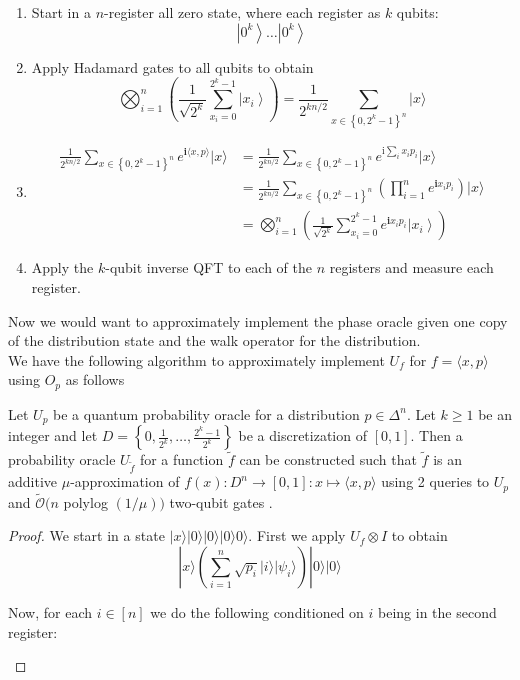 \begin{flushleft}
\begin{flushleft}
\begin{enumerate}
 
\item Start in a $n$-register all zero state, where each register as $k$ qubits:
$$
\left|0^k\right\rangle \ldots\left|0^k\right\rangle
$$
\item Apply Hadamard gates to all qubits to obtain
$$
\bigotimes_{i=1}^n\left(\frac{1}{\sqrt{2^k}} \sum_{x_i=0}^{2^k-1}\left|x_i\right\rangle\right)=\frac{1}{2^{k n / 2}} \sum_{x \in\left\{0,2^k-1\right\}^n}|x\rangle
$$
\item 
$$
\begin{aligned}
	\frac{1}{2^{k n / 2}} \sum_{x \in\left\{0,2^k-1\right\}^n} e^{\mathbf{i}\langle x, p\rangle}|x\rangle & =\frac{1}{2^{k n / 2}} \sum_{x \in\left\{0,2^k-1\right\}^n} e^{\mathrm{i} \sum_i x_i p_i}|x\rangle \\
	& =\frac{1}{2^{k n / 2}} \sum_{x \in\left\{0,2^k-1\right\}^n}\left(\prod_{i=1}^n e^{\mathbf{i} x_i p_i}\right)|x\rangle \\
	& =\bigotimes_{i=1}^n\left(\frac{1}{\sqrt{2^k}} \sum_{x_i=0}^{2^k-1} e^{\mathbf{i} x_i p_i}\left|x_i\right\rangle\right)
\end{aligned}
$$
\item Apply the $k$-qubit inverse QFT to each of the $n$ registers and measure each register.
\end{enumerate}
Now we would want to approximately implement the phase oracle given one copy of the distribution state and the walk operator for the distribution.\\
We have the following algorithm to approximately implement $U_f$ for $f=\langle x,p\rangle$ using $O_p$ as follows
\begin{lemma}
 Let $U_p$ be a quantum probability oracle for a distribution $p \in \Delta^n$. Let $k \geq 1$ be an integer and let $D=\left\{0, \frac{1}{2^k}, \ldots, \frac{2^k-1}{2^k}\right\}$ be a discretization of $[0,1]$. Then a probability oracle $U_{\tilde{f}}$ for a function $\tilde{f}$ can be constructed such that $\tilde{f}$ is an additive $\mu$-approximation of $f(x): D^n \rightarrow[0,1]: x \mapsto\langle x, p\rangle$ using 2 queries to $U_p$ and $\widetilde{\mathcal{O}}(n$ polylog $(1 / \mu))$ two-qubit gates .
\end{lemma}
\begin{proof}
 We start in a state $|x\rangle| 0\rangle|0\rangle|0\rangle 0\rangle$. First we apply $U_f \otimes I$ to obtain
$$
|x\rangle (\sum_{i=1}^n \sqrt{p_i}|i\rangle|\psi_i\rangle)|0\rangle |0 \rangle 
$$

Now, for each $i \in[n]$ we do the following conditioned on $i$ being in the second register:
\begin{enumerate}



\end{enumerate}
\end{proof}
\end{flushleft}
\end{flushleft}
